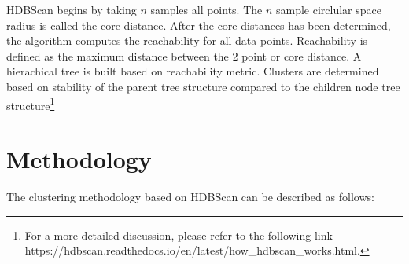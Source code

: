\documentclass{article}
\begin{document}
HDBScan begins by taking $n$ samples all points. The $n$ sample circlular space radius is called the core distance. After the core distances has been determined, the algorithm computes the reachability for all data points. Reachability is defined as the maximum distance between the 2 point or core distance. A hierachical tree is built based on reachability metric. Clusters are determined based on stability of the parent tree structure compared to the children node tree structure\footnote{For a more detailed discussion, please refer to the following link -  https://hdbscan.readthedocs.io/en/latest/how\_hdbscan\_works.html.}

\section{Methodology}
The clustering methodology based on HDBScan can be described as follows:
\end{document}
